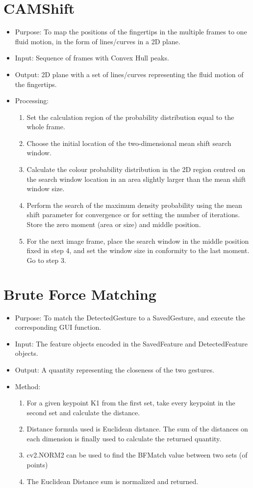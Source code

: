 \documentclass{scrreprt}
\begin{document}
\section{CAMShift}
\begin{itemize}
    \item Purpose: To map the positions of the fingertips in the multiple frames to one fluid motion, in the form of lines/curves in a 2D plane.
    \item Input: Sequence of frames with Convex Hull peaks.
    \item Output: 2D plane with a set of lines/curves representing the fluid motion of the fingertips.
    \item Processing:
    \begin{enumerate}
        \item Set the calculation region of the probability distribution equal to the whole frame.
        \item Choose the initial location of the two-dimensional mean shift search window.
        \item Calculate the colour probability distribution in the 2D region centred on the search window location in an area slightly larger than the mean shift window size.
        \item Perform the search of the maximum density probability using the mean shift parameter for convergence or for setting the number of iterations. Store the zero moment (area or size) and middle position.
        \item For the next image frame, place the search window in the middle position fixed in step 4, and set the window size in conformity to the last moment. Go to step 3. 
    \end{enumerate}
\end{itemize}
\section{Brute Force Matching}
\begin{itemize}
    \item Purpose: To match the DetectedGesture to a SavedGesture, and execute the corresponding GUI function.
    \item Input: The feature objects encoded in the SavedFeature and DetectedFeature objects.
    \item Output: A quantity representing the closeness of the two gestures.
    \item Method:
    \begin{enumerate}
        \item For a given keypoint K1 from the first set, take every keypoint in the second set and calculate the distance.
        \item Distance formula used is Euclidean distance. The sum of the distances on each dimension is finally used to calculate the returned quantity.
        \item cv2.NORM2 can be used to find the BFMatch value between two sets (of points)
        \item The Euclidean Distance sum is normalized and returned.
    \end{enumerate}
\end{itemize}
\end{document}
